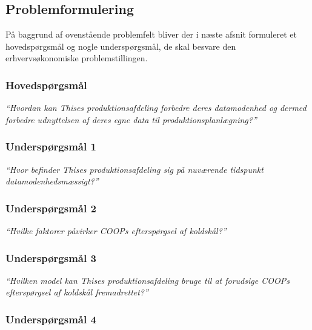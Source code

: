 \documentclass[
  12pt,
  a4paper,
  DIV=11,
  numbers=noendperiod,
  oneside,
  open=any]{scrartcl}
\begin{document}
\hypertarget{problemformulering}{%
\subsection{Problemformulering}\label{problemformulering}}

På baggrund af ovenstående problemfelt bliver der i næste afsnit
formuleret et hovedspørgsmål og nogle underspørgsmål, de skal besvare
den erhvervsøkonomiske problemstillingen.

\hypertarget{hovedspuxf8rgsmuxe5l}{%
\subsubsection{Hovedspørgsmål}\label{hovedspuxf8rgsmuxe5l}}

\emph{``Hvordan kan Thises produktionsafdeling forbedre deres
datamodenhed og dermed forbedre udnyttelsen af deres egne data til
produktionsplanlægning?''}

\hypertarget{underspuxf8rgsmuxe5l-1}{%
\subsubsection{Underspørgsmål 1}\label{underspuxf8rgsmuxe5l-1}}

\emph{``Hvor befinder Thises produktionsafdeling sig på nuværende
tidspunkt datamodenhedsmæssigt?''}

\hypertarget{underspuxf8rgsmuxe5l-2}{%
\subsubsection{Underspørgsmål 2}\label{underspuxf8rgsmuxe5l-2}}

\emph{``Hvilke faktorer påvirker COOPs efterspørgsel af koldskål?''}

\hypertarget{underspuxf8rgsmuxe5l-3}{%
\subsubsection{Underspørgsmål 3}\label{underspuxf8rgsmuxe5l-3}}

\emph{``Hvilken model kan Thises produktionsafdeling bruge til at
forudsige COOPs efterspørgsel af koldskål fremadrettet?''}

\hypertarget{underspuxf8rgsmuxe5l-4}{%
\subsubsection{Underspørgsmål 4}\label{underspuxf8rgsmuxe5l-4}}
\end{document}
